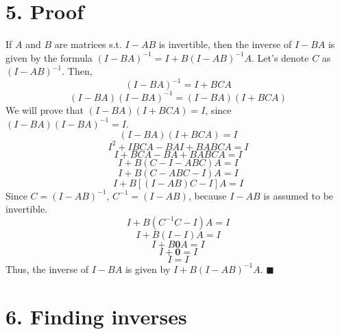 \documentclass[11pt]{article}
\begin{document}
\section*{5. Proof}
If \(A\) and \(B\) are matrices s.t. \(I - AB\) is invertible, then the inverse of \(I - BA\) is given by the formula \((I - BA)^{-1} = I + B(I - AB)^{-1}A\).\hfill\break
Let's denote \(C\) as \((I - AB)^{-1}\). Then,
\[
    (I - BA)^{-1} = I + BCA
\]
\[
    (I - BA)(I - BA)^{-1} = (I - BA)(I + BCA)
\]
We will prove that \((I - BA)(I + BCA) = I\), since \((I - BA)(I - BA)^{-1} = I\).
\[
    (I - BA)(I + BCA) = I
\]
\[
    I^2 + IBCA - BAI + BABCA = I
\]
\[
    I + BCA - BA + BABCA = I
\]
\[
    I + B(C - I - ABC)A = I
\]
\[
    I + B(C - ABC - I)A = I
\]
\[
    I + B[(I - AB)C - I]A = I
\]
Since \(C = (I - AB)^{-1}\), \(C^{-1} = (I - AB)\), because \(I - AB\) is assumed to be invertible.
\[
    I + B(C^{-1}C - I)A = I
\]
\[
    I + B(I - I)A = I
\]
\[
    I + B\textbf{0}A = I
\]
\[
    I + \textbf{0} = I
\]
\[
    I = I
\]
Thus, the inverse of \(I - BA\) is given by \(I + B(I - AB)^{-1}A\). $\blacksquare$ \pagebreak

\section*{6. Finding inverses}
\end{document}
